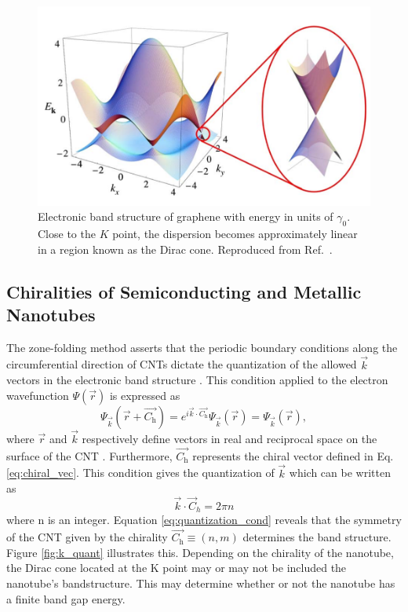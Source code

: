 \begin{figure}[ht]
	\centering
	\includegraphics[scale=0.4]{images/chapter_optical_props/dirac_cone}
	\caption{Electronic band structure of graphene with energy in units of $\gamma_0$. Close to the $K$ point, the dispersion becomes approximately linear in a region known as the Dirac cone. Reproduced from Ref.\ \cite{neto2009electronic}.}
	\label{fig:dirac_cone}
\end{figure}


\subsection{Chiralities of Semiconducting and Metallic Nanotubes}

The zone-folding method asserts that the periodic boundary conditions along the circumferential direction of CNTs dictate the quantization of the allowed $\vec{k}$ vectors in the electronic band structure \cite{charlier2007electronic}. This condition applied to the electron wavefunction $\Psi(\vec{r})$ is expressed as
\begin{equation}
\Psi_{\vec{k}}(\vec{r} + \vec{C_\text{h}}) = e^{i \vec{k} \cdot \vec{C_\text{h}}} \Psi_{\vec{k}}(\vec{r}) = \Psi_{\vec{k}}(\vec{r}),
\label{eq:boundary_cond}
\end{equation}
where $\vec{r}$ and $\vec{k}$ respectively define vectors in real and reciprocal space on the surface of the CNT \cite{charlier2007electronic}. Furthermore, $\vec{C_\text{h}}$ represents the chiral vector defined in Eq. \ref{eq:chiral_vec}. This condition gives the quantization of $\vec{k}$ which can be written as
\begin{equation}
	\vec{k} \cdot \vec{C}_h = 2\pi n
	\label{eq:quantization_cond}
\end{equation}
where n is an integer. Equation \ref{eq:quantization_cond} reveals that the symmetry of the CNT given by the chirality $\vec{C_\text{h}} \equiv (n,m)$ determines the band structure. Figure \ref{fig:k_quant} illustrates this. Depending on the chirality of the nanotube, the Dirac cone located at the K point may or may not be included the nanotube's bandstructure. This may determine whether or not the nanotube has a finite band gap energy.

